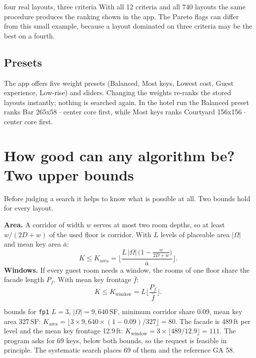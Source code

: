 \documentclass[10pt,a4paper]{article}
\newcommand{\code}[1]{\texttt{\small #1}}
\begin{document}
\begin{example}{four real layouts, three criteria}
With all 12 criteria and all 740 layouts the same procedure produces the ranking shown in the app. The
Pareto flags can differ from this small example, because a layout dominated on three criteria may be the best on a
fourth.
\end{example}

\subsection{Presets}
The app offers five weight presets (Balanced, Most keys, Lowest cost, Guest experience, Low-rise) and sliders. Changing
the weights re-ranks the stored layouts instantly; nothing is searched again. In the hotel run the Balanced preset
ranks Bar 265x58 $\cdot$ center core first, while Most keys ranks Courtyard 156x156 $\cdot$ center core first.


\section{How good can any algorithm be? Two upper bounds}
Before judging a search it helps to know what is possible at all. Two bounds hold for every layout.

\textbf{Area.} A corridor of width $w$ serves at most two room depths, so at least $w/(2D + w)$ of the used floor is
corridor. With $L$ levels of placeable area $|\Omega|$ and mean key area $\bar a$:
\[ K \le K_{\text{area}} = \Big\lfloor \frac{L\,|\Omega|\,\big(1 - \tfrac{w}{2D+w}\big)}{\bar a} \Big\rfloor . \]
\textbf{Windows.} If every guest room needs a window, the rooms of one floor share the facade length $P_f$. With mean
key frontage $\bar f$:
\[ K \le K_{\text{window}} = L \Big\lfloor \frac{P_f}{\bar f} \Big\rfloor . \]
\begin{example}{bounds for \code{fp1}}
$L = 3$, $|\Omega| = 9,640$\,SF, minimum corridor share 0.09, mean key area 327\,SF:
$K_{\text{area}} = \lfloor 3 \times 9,640 \times (1 - 0.09) / 327 \rfloor = 80$.
The facade is 489\,ft per level and the mean key frontage 12.9\,ft:
$K_{\text{window}} = 3 \times \lfloor 489 / 12.9 \rfloor = 111$.
The program asks for 69 keys, below both bounds, so the request is feasible in principle. The systematic search
places 69 of them and the reference GA 58.
\end{example}
\end{document}
